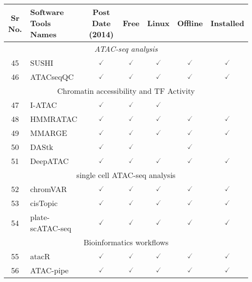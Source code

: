 \documentclass[10pt,letterpaper]{article}
\begin{document}
\begin{table}[!ht]
\begin{adjustwidth}{-2.25in}{0in} %
\centering
\begin{tabular}{|c|l|c|c|c|c|c|}
\hline
Sr No. & Software Tools Names & Post Date (2014) & Free & Linux & Offline & Installed \\ 
\hline
\hline
\multicolumn{7}{|c|}{\textit{ATAC-seq analysis}} \\ \hline
\hline
45 & SUSHI\cite{hatakeyama2016sushi} & $\checked$ & $\checked$ & $\checked$ & $\checked$ & $\checked$ \\ 
46 & ATACseqQC\cite{ou2018atacseqqc} &  $\checked$ & $\checked$ & $\checked$ & $\checked$ & $\checked$ \\ \hline
\hline
\multicolumn{7}{|c|}{Chromatin accessibility and TF Activity} \\ 
\hline
\hline
47 & I-ATAC\cite{ahmed2017atac} & $\checked$ & $\checked$ & $\checked$ & & \\ 
48 & HMMRATAC\cite{tarbell2018hmmratac} &  $\checked$ & $\checked$ & $\checked$ & $\checked$ & $\checked$ \\ 
49 & MMARGE\cite{link2018mmarge} & $\checked$ & $\checked$ & $\checked$ & $\checked$ & $\checked$ \\ 
50 & DAStk\cite{tripodi2018detecting} & $\checked$ & $\checked$ & & $\checked$ & \\ 
51 & DeepATAC\cite{hiranuma2017deepatac} &  $\checked$ & $\checked$ & $\checked$ & $\checked$ & $\checked$ \\ \hline
\hline
\multicolumn{7}{|c|}{single cell ATAC-seq analysis} \\ \hline
\hline
52 & chromVAR\cite{schep2017chromvar} &  $\checked$ & $\checked$ & $\checked$ & $\checked$ & $\checked$  \\ 
53 & cisTopic\cite{bravo2018cis} &  $\checked$ & $\checked$ & $\checked$ & $\checked$ & $\checked$ \\ 
54 & plate-scATAC-seq\cite{chen2018rapid}  &  $\checked$ & $\checked$ & $\checked$ & $\checked$ & $\checked$ \\ \hline
\hline
\multicolumn{7}{|c|}{Bioinformatics workflows} \\ \hline
\hline
55 & atacR\cite{shrestha2018workflow} & $\checked$ & $\checked$ & $\checked$ & $\checked$ & $\checked$ \\ 
56 & ATAC-pipe\cite{zuo2018atac} & $\checked$ & $\checked$ & $\checked$ & $\checked$ & $\checked$ \\ 

\end{tabular}
\end{adjustwidth}
\end{table}
\end{document}
